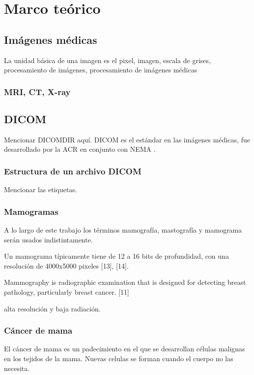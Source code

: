 \chapter{Marco teórico}

\section{Imágenes médicas}
La unidad básica de una imagen es el pixel, imagen, escala de grises,
procesamiento de imágenes, procesamiento de imágenes médicas

\subsection{MRI, CT, X-ray}

\section{DICOM}
Mencionar DICOMDIR aquí.
DICOM es el estándar en las imágenes médicas, fue desarrollado por la ACR en
conjunto con NEMA \cite{acrnema, pianykh2011digital}.

\subsection{Estructura de un archivo DICOM}
Mencionar las etiquetas.

\subsection{Mamogramas}
A lo largo de este trabajo los términos mamografía, mastografía y mamograma
serán usados indistintamente. 

Un mamograma típicamente tiene de 12 a 16 bits de profundidad, con una
resolución de 4000x5000 pixeles [13], [14].  

Mammography is radiographic examination that is designed for detecting breast
pathology, particularly breast cancer. [11]

alta resolución y baja radiación.

\subsection{Cáncer de mama} %
El cáncer de mama es un padecimiento en el que se desarrollan células malignas
en los tejidos de la mama. Nuevas celulas se forman cuando el cuerpo no las
necesita. 

